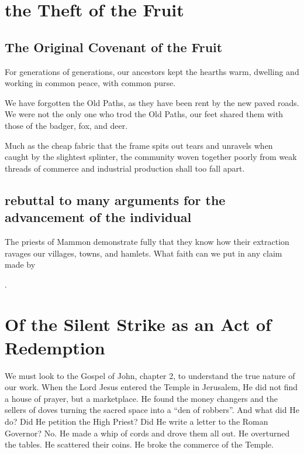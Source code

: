 \section{the Theft of the Fruit}
\subsection{The Original Covenant of the Fruit}

For generations of generations, our ancestors kept the hearths warm, dwelling and working in common peace, with common purse.

We have forgotten the Old Paths, as they have been rent by the new paved roads.
We were not the only one who trod the Old Paths, our feet shared them with those of the badger, fox, and deer.

Much as the cheap fabric that the frame spits out tears and unravels when caught by the slightest splinter, the community woven together poorly from weak threads of commerce and industrial production shall too fall apart.


\subsection{rebuttal to many arguments for the advancement of the individual}

The priests of Mammon demonstrate fully that they know how their extraction ravages our villages, towns, and hamlets. What faith can we put in any claim made by

.

\section{Of the Silent Strike as an Act of Redemption}
We must look to the Gospel of John, chapter 2, to understand the true nature of our work.
When the Lord Jesus entered the Temple in Jerusalem, He did not find a house of prayer, but a marketplace.
He found the money changers and the sellers of doves turning the sacred space into a ``den of robbers''.
And what did He do? Did He petition the High Priest? Did He write a letter to the Roman Governor?
No. He made a whip of cords and drove them all out.
He overturned the tables. He scattered their coins.
He broke the commerce of the Temple.

